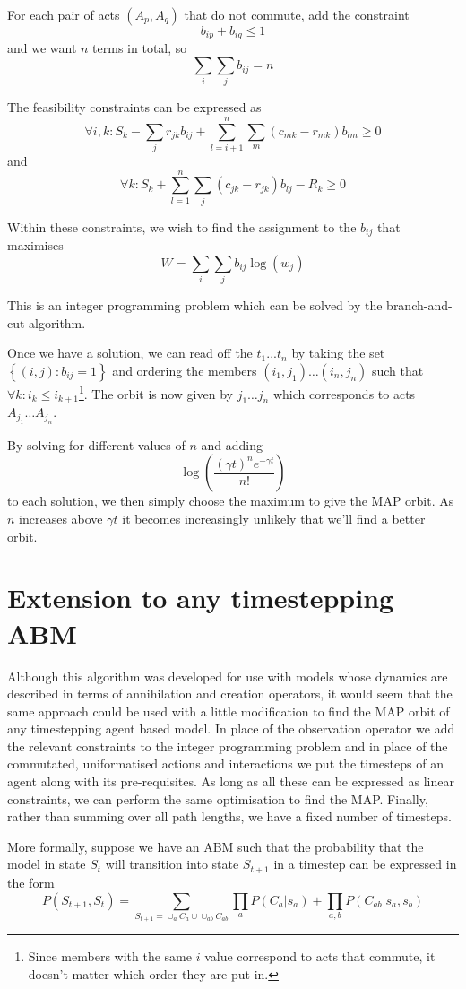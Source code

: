 \documentclass{article}
\begin{document}
For each pair of acts $(A_p,A_q)$ that do not commute, add the constraint
\[
b_{ip} + b_{iq} \le 1
\]
and we want $n$ terms in total, so
\[
\sum_i\sum_j b_{ij} = n
\]

The feasibility constraints can be expressed as
\[
\forall i,k:    S_k - \sum_j r_{jk}b_{ij} + \sum_{l=i+1}^n\sum_m \left(c_{mk} - r_{mk}\right)b_{lm}  \ge 0
\]
and
\[
\forall k: S_k + \sum_{l=1}^n\sum_j \left(c_{jk} - r_{jk}\right)b_{lj} -R_k \ge 0
\]

Within these constraints, we wish to find the assignment to the $b_{ij}$ that maximises
\[
W = \sum_i\sum_j b_{ij}\log(w_j)
\]

This is an integer programming problem which can be solved by the branch-and-cut algorithm.

Once we have a solution, we can read off the $t_1...t_n$ by taking the set $\left\{(i,j): b_{ij}=1\right\}$ and ordering the members $(i_1,j_1) \dots (i_n,j_n)$ such that $\forall k: i_k \le i_{k+1}$\footnote{Since members with the same $i$ value correspond to acts that commute, it doesn't matter which order they are put in.}. The orbit is now given by $j_1\dots j_n$ which corresponds to acts $A_{j_1}\dots A_{j_n}$.

By solving for different values of $n$ and adding
\[
\log\left(\frac{(\gamma t)^n e^{-\gamma t}}{n!}\right)
\]
to each solution, we then simply choose the maximum to give the MAP orbit. As $n$ increases above $\gamma t$ it becomes increasingly unlikely that we'll find a better orbit.

\section{Extension to any timestepping ABM}

Although this algorithm was developed for use with models whose dynamics are described in terms of annihilation and creation operators, it would seem that the same approach could be used with a little modification to find the MAP orbit of any timestepping agent based model. In place of the observation operator we add the relevant constraints to the integer programming problem and in place of the commutated, uniformatised actions and interactions we put the timesteps of an agent along with its pre-requisites. As long as all these can be expressed as linear constraints, we can perform the same optimisation to find the MAP. Finally, rather than summing over all path lengths, we have a fixed number of timesteps.

More formally, suppose we have an ABM such that the probability that the model in state $S_t$ will transition into state $S_{t+1}$ in a timestep can be expressed in the form
\[
P(S_{t+1},S_t) = \sum_{S_{t+1} = \cup_a C_a \cup \cup_{ab} C_{ab}} \prod_a P(C_{a} | s_{a}) + \prod_{a,b} P(C_{ab}|s_a, s_b)
\]
\end{document}

